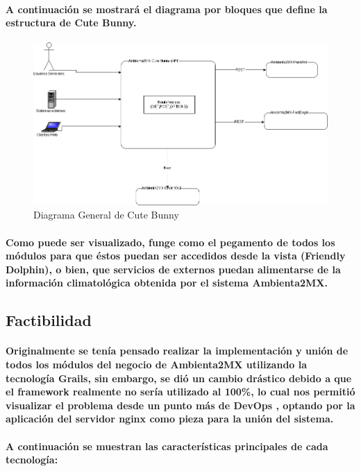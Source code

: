     \paragraph{A continuación se mostrará el diagrama por bloques que define la estructura de Cute Bunny.}
      \begin{figure}[b!]
        \centering
        \includegraphics[width=\textwidth]{./images/DiagramaCuteBunny.png}
        \caption{Diagrama General de Cute Bunny}
      \end{figure}
    \paragraph{Como puede ser visualizado, funge como el pegamento de todos los módulos para que éstos puedan ser accedidos desde la vista (Friendly Dolphin), o bien, que servicios de externos puedan alimentarse de la información climatológica obtenida por el sistema Ambienta2MX.}    
  \subsection{Factibilidad}      
    \paragraph{Originalmente se tenía pensado realizar la implementación y unión de todos los módulos del negocio de Ambienta2MX utilizando la tecnología Grails, sin embargo, se dió un cambio drástico debido a que el framework realmente no sería utilizado al 100\%, lo cual nos permitió visualizar el problema desde un punto más de DevOps \cite{38}, optando por la aplicación del servidor nginx como pieza para la unión del sistema.}
    \paragraph{A continuación se muestran las características principales de cada tecnología:}

